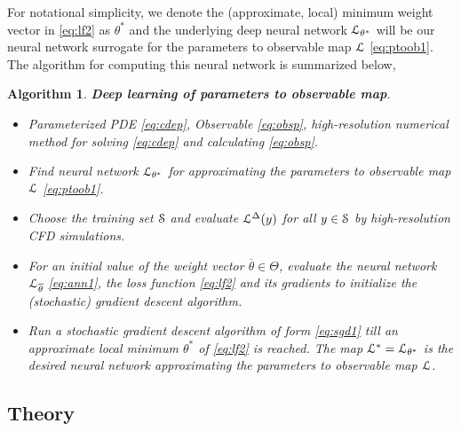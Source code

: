\documentclass[a4paper]{article}
\numberwithin{equation}{section}
\newtheorem{algorithm}[theorem]{Algorithm}
\numberwithin{equation}{section}
\theoremstyle{definition}
\theoremstyle{myremarkstyle}
\newcommand{\map}{\EuScript{L}}
\newcommand{\train}{\EuScript{S}}
\begin{document}
For notational simplicity, we denote the (approximate, local) minimum weight vector in \eqref{eq:lf2} as $\theta^{\ast}$ and the underlying deep neural network $\map_{\theta^{\ast}}$ will be our neural network surrogate for the parameters to observable map $\map$ \eqref{eq:ptoob1}. The algorithm for computing this neural network is summarized below,
\begin{algorithm} 
\label{alg:DL} {\bf Deep learning of parameters to observable map}. 
\begin{itemize}
\item [{\bf Inputs}:] Parameterized PDE \eqref{eq:cdep}, Observable \eqref{eq:obsp}, high-resolution numerical method for solving \eqref{eq:cdep} and calculating \eqref{eq:obsp}.
\item [{\bf Goal}:] Find neural network $\map_{\theta^{\ast}}$ for approximating the parameters to observable map $\map$ \eqref{eq:ptoob1}. 
\item [{\bf Step $1$}:] Choose the training set $\train$ and evaluate $\map^{\Delta}(y)$ for all $y \in \train$ by high-resolution CFD simulations. 
\item [{\bf Step $2$}:] For an initial value of the weight vector $\overline{\theta} \in \Theta$, evaluate the neural network $\map_{\overline{\theta}}$ \eqref{eq:ann1}, the loss function \eqref{eq:lf2} and its gradients to initialize the
(stochastic) gradient descent algorithm.
\item [{\bf Step $3$}:] Run a stochastic gradient descent algorithm of form \eqref{eq:sgd1} till an approximate local minimum $\theta^{\ast}$ of \eqref{eq:lf2} is reached. The map $\map^{\ast} = \map_{\theta^{\ast}}$ is the desired neural network approximating the
parameters to observable map $\map$.
\end{itemize}
\end{algorithm}
\subsection{Theory}
\label{sec:theo}
\end{document}
